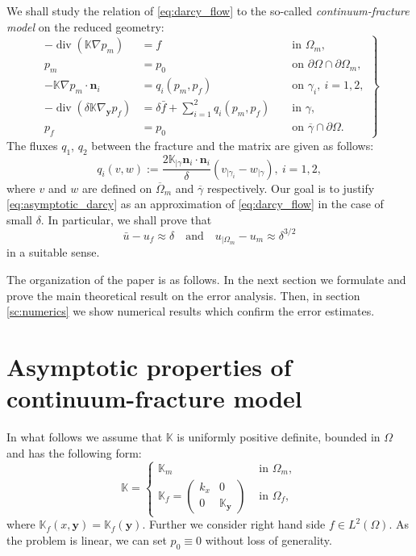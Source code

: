 \documentclass{llncs}
\def\vc#1{\mathbf{\boldsymbol{#1}}}     %
\def\tn#1{{\mathbb{#1}}}    %
\def\div{\operatorname{div}}
\def\yy{{\vc y}}
\begin{document}
We shall study the relation of \eqref{eq:darcy_flow} to the so-called \emph{continuum-fracture model} on the reduced geometry:
\begin{equation}
\label{eq:asymptotic_darcy}
\left.
\begin{aligned}
-\div(\tn K\nabla p_m) &= f &&\mbox{ in }\Omega_m,\\
p_m &= p_0 &&\mbox{ on }\partial\Omega\cap\partial\Omega_m,\\
-\tn K\nabla p_m\cdot\vc n_i &= q_i(p_m,p_f) &&\mbox{ on }\gamma_i,~i=1,2,\\
-\div(\delta\tn K\nabla_\yy p_f) &= \delta\bar f + \sum_{i=1}^2 q_i(p_m,p_f) &&\mbox{ in }\gamma,\\
p_f &= p_0 &&\mbox{ on }\overline\gamma\cap\partial\Omega.
\end{aligned}
\right\}
\end{equation}
The fluxes $q_1$, $q_2$ between the fracture and the matrix are given as follows:
\[ q_i(v,w):=\frac{2\tn K_{|\gamma}\vc n_i\cdot\vc n_i}\delta (v_{|\gamma_i}-w_{|\gamma}),\ i=1,2, \]
where $v$ and $w$ are defined on $\overline{\Omega}_m$ and $\overline{\gamma}$ respectively.
Our goal is to justify \eqref{eq:asymptotic_darcy} as an approximation of \eqref{eq:darcy_flow} in the case of small $\delta$.
In particular, we shall prove that
\[ \bar u - u_f \approx \delta\quad\mbox{and}\quad u_{|\Omega_m}-u_m \approx \delta^{3/2} \]
in a suitable sense.


The organization of the paper is as follows.
In the next section we formulate and prove the main theoretical result on the error analysis.
Then, in section \ref{sc:numerics} we show numerical results which confirm the error estimates.









\section{Asymptotic properties of continuum-fracture model}


In what follows we assume that $\tn K$ is uniformly positive definite, bounded in $\Omega$ and has the following form:
\[ \tn K = \begin{cases}\tn K_m & \mbox{ in }\Omega_m,\\ \tn K_f = \begin{pmatrix}k_x & 0\\0&\tn K_\yy\end{pmatrix} & \mbox{ in }\Omega_f,\end{cases} \]
where $\tn K_f(x,\yy)=\tn K_f(\yy)$.
Further we consider right hand side $f\in L^2(\Omega)$.
As the problem is linear, we can set $p_0\equiv 0$ without loss of generality.
\end{document}
